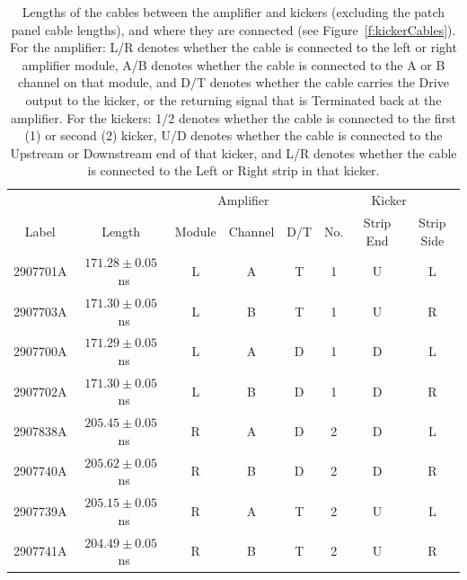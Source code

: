 \begin{table}
  \begin{center}
    \begin{tabular}{| c c | c c c | c c c |}
	   \hline
                &  & \multicolumn{3}{c|}{Amplifier} & \multicolumn{3}{c|}{Kicker} \\ 
       Label    & Length & Module & Channel & D/T    & No. & Strip End & Strip Side \\ \hline
       2907701A & \(171.28\pm0.05\)~ns & L & A & T & 1 & U & L \\
       2907703A & \(171.30\pm0.05\)~ns & L & B & T & 1 & U & R \\
       2907700A & \(171.29\pm0.05\)~ns & L & A & D & 1 & D & L \\
       2907702A & \(171.30\pm0.05\)~ns & L & B & D & 1 & D & R \\ \hline
       2907838A & \(205.45\pm0.05\)~ns & R & A & D & 2 & D & L \\
       2907740A & \(205.62\pm0.05\)~ns & R & B & D & 2 & D & R \\
       2907739A & \(205.15\pm0.05\)~ns & R & A & T & 2 & U & L \\
       2907741A & \(204.49\pm0.05\)~ns & R & B & T & 2 & U & R \\
 	   \hline
    \end{tabular}
    \caption{Lengths of the cables between the amplifier and kickers (excluding the patch panel cable lengths), and where they are connected (see Figure~\ref{f:kickerCables}). For the amplifier: L/R denotes whether the cable is connected to the left or right amplifier module, A/B denotes whether the cable is connected to the A or B channel on that module, and D/T denotes whether the cable carries the Drive output to the kicker, or the returning signal that is Terminated back at the amplifier. For the kickers: 1/2 denotes whether the cable is connected to the first (1) or second (2) kicker, U/D denotes whether the cable is connected to the Upstream or Downstream end of that kicker, and L/R denotes whether the cable is connected to the Left or Right strip in that kicker.}
  	\label{t:kickCabLengths}
  \end{center}
\end{table}

